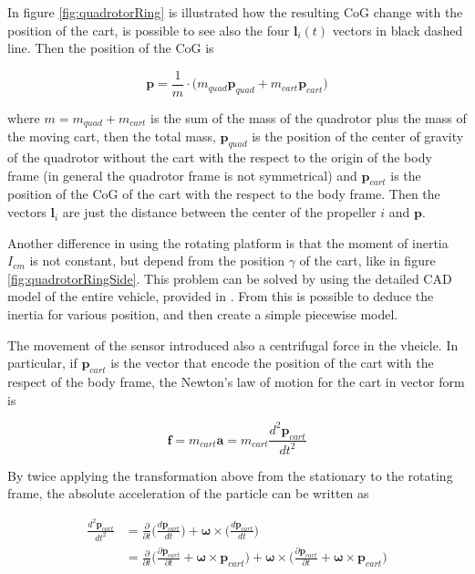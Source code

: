 \noindent In figure \ref{fig:quadrotorRing} is illustrated how the resulting CoG change with the position of the cart, is possible to see also the four $\mathbf{l}_i(t)$ vectors in black dashed line. Then the position of the CoG is

\begin{equation}
	\mathbf{p} = \frac{1}{m}\cdot \bigl(m_{quad}\mathbf{p}_{quad} + m_{cart}\mathbf{p}_{cart}\bigl)	
	\label{eq:CoG}
\end{equation}

\noindent where $m=m_{quad}+m_{cart}$ is the sum of the mass of the quadrotor plus the mass of the moving cart, then the total mass, $\mathbf{p}_{quad}$ is the position of the center of gravity of the quadrotor without the cart with the respect to the origin of the body frame (in general the quadrotor frame is not symmetrical) and $\mathbf{p}_{cart}$ is the position of the CoG of the cart with the respect to the body frame. Then the vectors $\mathbf{l}_i$ are just the distance between the center of the propeller $i$ and $\mathbf{p}$.

\noindent Another difference in using the rotating platform is that the moment of inertia $I_{cm}$ is not constant, but depend from the position $\gamma$ of the cart, like in figure \ref{fig:quadrotorRingSide}. This problem can be solved by using the detailed CAD model of the entire vehicle, provided in \cite{Carlos}. From this is possible to deduce the inertia for various position, and then create a simple piecewise model. 

\noindent The movement of the sensor introduced also a centrifugal force in the vheicle. In particular, if $\mathbf{p}_{cart}$ is the vector that encode the position of the cart with the respect of the body frame, the Newton's law of motion for the cart in vector form is 

\begin{equation}
	\mathbf{f}=m_{cart}\mathbf{a}=m_{cart}\frac{d^2\mathbf{p}_{cart}}{dt^2}
	\label{eq:NewtonForce}
\end{equation}

\noindent By twice applying the transformation above from the stationary to the rotating frame, the absolute acceleration of the particle can be written as \cite{physics}

\begin{align}
	\frac{d^2\mathbf{p}_{cart}}{dt^2} &= \frac{\partial}{\partial t}\Big(\frac{d\mathbf{p}_{cart}}{dt}\Big)+\boldsymbol{\omega}\times\Big(\frac{d\mathbf{p}_{cart}}{dt}\Big) \nonumber \\
	&= \frac{\partial}{\partial t}\Big(\frac{\partial\mathbf{p}_{cart}}{\partial t}+\boldsymbol{\omega}\times\mathbf{p}_{cart}\Big)+\boldsymbol{\omega}\times\Big(\frac{\partial\mathbf{p}_{cart}}{\partial t}+\boldsymbol{\omega}\times\mathbf{p}_{cart}\Big)
	\label{eq:centrifugalAcceleration}
\end{align}

